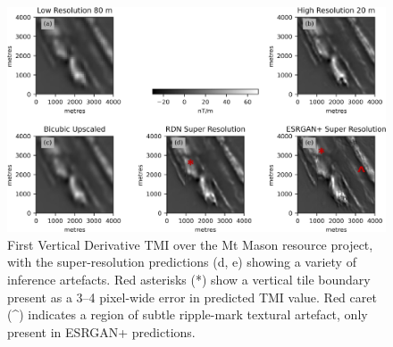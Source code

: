 \begin{landscape}
    \begin{figure}[hbtp]
        \centering
        \includegraphics[width=\linewidth,trim={0 0 0 0},clip]{fig/p1/1vd.jpg}
        \caption[First vertical derivative over the case study grid]{First Vertical Derivative TMI over the Mt Mason resource project, with the super-resolution predictions (d, e) showing a variety of inference artefacts.
        Red asterisks (*) show a vertical tile boundary present as a 3--4 pixel-wide error in predicted TMI value.
        Red caret (\^{ }) indicates a region of subtle ripple-mark textural artefact, only present in ESRGAN+ predictions.
        }
        \label{fig:jhillvis}
    \end{figure}
\end{landscape}

